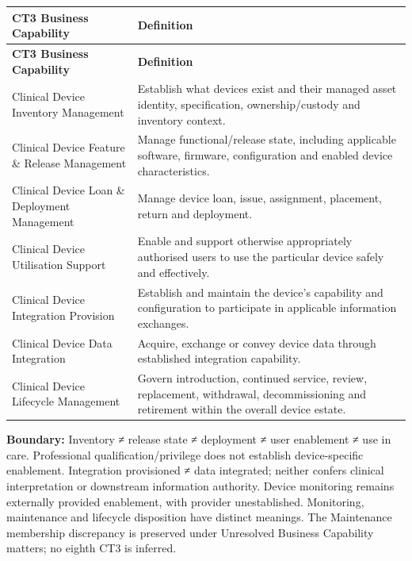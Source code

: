 \label{rad:business:510}
\begingroup\small\setlength{\TableWidth}{\dimexpr\linewidth-4\tabcolsep-3\arrayrulewidth\relax}
\begin{longtable}{|>{\raggedright\arraybackslash}p{0.35\TableWidth}|>{\raggedright\arraybackslash}p{0.65\TableWidth}|}
\hline\rowcolor{TableHead}\textbf{CT3 Business Capability} & \textbf{Definition}\\\hline\endfirsthead
\hline\rowcolor{TableHead}\textbf{CT3 Business Capability} & \textbf{Definition}\\\hline\endhead
\hline\endfoot
Clinical Device Inventory Management & Establish what devices exist and their managed asset identity, specification, ownership/\allowbreak{}custody and inventory context.\\\hline
Clinical Device Feature \& Release Management & Manage functional/\allowbreak{}release state, including applicable software, firmware, configuration and enabled device characteristics.\\\hline
Clinical Device Loan \& Deployment Management & Manage device loan, issue, assignment, placement, return and deployment.\\\hline
Clinical Device Utilisation Support & Enable and support otherwise appropriately authorised users to use the particular device safely and effectively.\\\hline
Clinical Device Integration Provision & Establish and maintain the device’s capability and configuration to participate in applicable information exchanges.\\\hline
Clinical Device Data Integration & Acquire, exchange or convey device data through established integration capability.\\\hline
Clinical Device Lifecycle Management & Govern introduction, continued service, review, replacement, withdrawal, decommissioning and retirement within the overall device estate.\\\hline
\end{longtable}\endgroup
{}\label{rad:business:520}

\textbf{Boundary:} Inventory ≠ release state ≠ deployment ≠ user enablement ≠ use in care. Professional qualification/\allowbreak{}privilege does not establish device-specific enablement. Integration provisioned ≠ data integrated; neither confers clinical interpretation or downstream information authority. Device monitoring remains externally provided enablement, with provider unestablished. Monitoring, maintenance and lifecycle disposition have distinct meanings. The Maintenance membership discrepancy is preserved under Unresolved Business Capability matters; no eighth CT3 is inferred.


